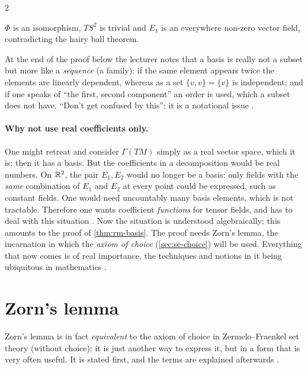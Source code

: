 \begin{paracol}{2}
\begin{secondary}
$\Phi$ is an isomorphism, $TS^2$ is trivial and $E_1$ is an everywhere non-zero vector field, contradicting the hairy ball theorem.
\end{secondary}
\begin{coursenote}
At the end of the proof below the lecturer notes that a basis is really not a subset but more like a \emph{sequence} (a family): if the same element appears twice the elements are linearly dependent, whereas as a set $\{v,v\}=\{v\}$ is independent; and if one speaks of ``the first, second component'' an order is used, which a subset does not have. ``Don't get confused by this''; it
is a notational issue   .
\end{coursenote}

\paragraph{Why not use real coefficients only.} One might retreat and consider $\Gamma(TM)$ simply as a real vector space, which it is; then it has a basis. But the coefficients in a decomposition would be real numbers. On $\mathbb{R}^2$, the pair $E_1,E_2$ would no longer be a basis: only fields with the \emph{same} combination of $E_1$ and $E_2$ at every point could be expressed, such as constant
fields. One would need uncountably many basis elements, which is not tractable. Therefore one wants coefficient \emph{functions} for tensor fields, and has to deal with this situation    .
\medskip
Now the situation is understood algebraically; this amounts to the proof of \cref{thm:rm-basis}. The proof needs Zorn's lemma, the incarnation in which the \emph{axiom of choice} (\cref{sec:se-choice}) will be used. Everything that now comes is of real importance, the techniques and notions in it being ubiquitous in mathematics    .

\section{Zorn's lemma}\label{sec:rm-zorn}

Zorn's lemma is in fact \emph{equivalent} to the axiom of choice in Zermelo--Fraenkel set theory (without choice): it is just another way to express it, but in a form that is very often useful. It is stated first, and the terms are explained afterwards   .


\end{paracol}
